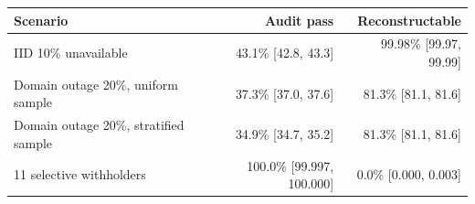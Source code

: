 \begin{tabular}{@{}lrr@{}}
\toprule
Scenario & Audit pass & Reconstructable\\
\midrule
IID 10\% unavailable & 43.1\% [42.8, 43.3] & 99.98\% [99.97, 99.99]\\
Domain outage 20\%, uniform sample & 37.3\% [37.0, 37.6] & 81.3\% [81.1, 81.6]\\
Domain outage 20\%, stratified sample & 34.9\% [34.7, 35.2] & 81.3\% [81.1, 81.6]\\
11 selective withholders & 100.0\% [99.997, 100.000] & 0.0\% [0.000, 0.003]\\
\bottomrule
\end{tabular}
